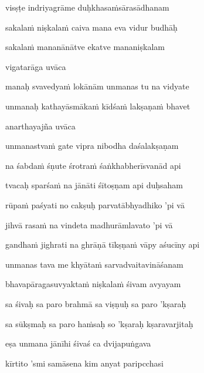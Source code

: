 visṣṭe indriyagrāme duḥkhasaṁsārasādhanam \veg\dontdisplaylinenum
{}

sakalaṁ niṣkalaṁ caiva mana eva vidur budhāḥ\thinspace{\dandab} \dontdisplaylinenum

sakalaṁ mananānātve ekatve mananiṣkalam \veg\dontdisplaylinenum


vigatarāga uvāca~{\dandab}\dontdisplaylinenum 

manaḥ svavedyaṁ lokānām unmanas tu na vidyate\thinspace{\danda} \dontdisplaylinenum

unmanaḥ kathayāsmākaṁ kīdśaṁ lakṣaṇaṁ bhavet \veg\dontdisplaylinenum

anarthayajña uvāca~{\dandab}\dontdisplaylinenum 

unmanastvaṁ gate vipra nibodha daśalakṣaṇam\thinspace{\danda} \dontdisplaylinenum

na śabdaṁ śṇute śrotraṁ śaṅkhabherīsvanād api \veg\dontdisplaylinenum
{}

tvacaḥ sparśaṁ na jānāti śītoṣṇam api duḥsaham\thinspace{\dandab} \dontdisplaylinenum

rūpaṁ paśyati no cakṣuḥ parvatābhyadhiko 'pi vā \veg\dontdisplaylinenum

jihvā rasaṁ na vindeta madhurāmlavato 'pi vā\thinspace{\dandab} \dontdisplaylinenum

gandhaṁ jighrati na ghrāṇā tīkṣṇaṁ vāpy aśucīny api \veg\dontdisplaylinenum
{}

unmanas tava me khyātaṁ sarvadvaitavināśanam\thinspace{\dandab} \dontdisplaylinenum

bhavapāragasuvyaktaṁ niṣkalaṁ śivam avyayam \veg\dontdisplaylinenum
{}

sa śivaḥ sa paro brahmā sa viṣṇuḥ sa paro 'kṣaraḥ\thinspace{\dandab} \dontdisplaylinenum

sa sūkṣmaḥ sa paro haṁsaḥ so 'kṣaraḥ kṣaravarjitaḥ \veg\dontdisplaylinenum

eṣa unmana jānīhi śivaś ca dvijapuṅgava\thinspace{\dandab} \dontdisplaylinenum

kīrtito 'smi samāsena kim anyat paripcchasi \veg\dontdisplaylinenum


